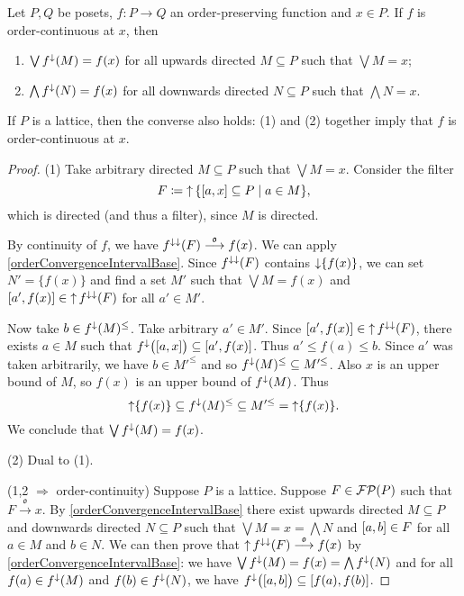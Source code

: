 \begin{proposition}
Let $P, Q$ be posets, $f: P\to Q$ an order-preserving function and $x\in P$. If $f$ is order-continuous at $x$, then 
\begin{enumerate}
\item $\bigvee f^\downarrow(M) = f(x)$ for all upwards directed $M \subseteq P$ such that $\bigvee M = x$;
\item $\bigwedge f^\downarrow(N) = f(x)$ for all downwards directed $N \subseteq P$ such that $\bigwedge N = x$.
\end{enumerate}
If $P$ is a lattice, then the converse also holds: (1) and (2) together imply that $f$ is order-continuous at $x$.
\end{proposition}
\begin{proof}
(1) Take arbitrary directed $M \subseteq P$ such that $\bigvee M = x$. Consider the filter
\[ F \defeq \upset \setbuilder{\interval{a,x} \subseteq P}{a\in M}, \]
which is directed (and thus a filter), since $M$ is directed.

By continuity of $f$, we have $f^{\downarrow\downarrow}(F)\overset{\mathfrak{o}}{\longrightarrow} f(x)$. We can apply \ref{orderConvergenceIntervalBase}. Since $f^{\downarrow\downarrow}(F)$ contains $\operatorname{\downarrow}\{f(x)\}$, we can set $N' = \{f(x)\}$ and find a set $M'$ such that $\bigvee M = f(x)$ and $\interval{a', f(x)} \in \upset f^{\imf\imf}(F)$ for all $a'\in M'$.

Now take $b\in f^\downarrow(M)^\leq$. Take arbitrary $a'\in M'$. Since $\interval{a', f(x)} \in \upset f^{\imf\imf}(F)$, there exists $a\in M$ such that $f^\imf\big(\interval{a, x}\big) \subseteq \interval{a', f(x)}$. Thus $a'\leq f(a) \leq b$. Since $a'$ was taken arbitrarily, we have $b \in M'^{\leq}$ and so $f^\downarrow(M)^\leq \subseteq M^{\prime\leq}$. Also $x$ is an upper bound of $M$, so $f(x)$ is an upper bound of $f^\downarrow(M)$. Thus
\[ \operatorname{\uparrow}\{f(x)\} \subseteq f^{\downarrow}(M)^\leq \subseteq M^{\prime\leq} = \operatorname{\uparrow}\{f(x)\}. \]
We conclude that $\bigvee f^{\downarrow}(M) = f(x)$.

(2) Dual to (1).

(1,2 $\Rightarrow$ order-continuity) Suppose $P$ is a lattice. Suppose $F\in \operatorname{\mathcal{FP}}(P)$ such that $F\overset{\mathfrak{o}}{\longrightarrow} x$. By \ref{orderConvergenceIntervalBase} there exist upwards directed $M \subseteq P$ and downwards directed $N \subseteq P$ such that $\bigvee M = x = \bigwedge N$ and $\interval{a,b}\in F$ for all $a\in M$ and $b\in N$. We can then prove that $\operatorname{\uparrow} f^{\downarrow\downarrow}(F)\overset{\mathfrak{o}}{\longrightarrow} f(x)$ by \ref{orderConvergenceIntervalBase}: we have $\bigvee f^\downarrow(M) = f(x) = \bigwedge f^\downarrow(N)$ and for all $f(a) \in f^\downarrow(M)$ and $f(b)\in f^\downarrow(N)$, we have $f^\imf\big(\interval{a,b}\big) \subseteq \interval{f(a), f(b)}$.
\end{proof}

